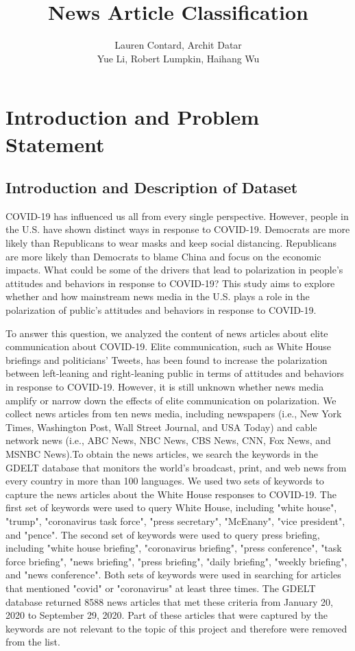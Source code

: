 \documentclass[11pt]{article}
\title{\Huge News Article Classification}
\author{Lauren Contard, Archit Datar \\ 
Yue Li, Robert Lumpkin, Haihang Wu}
\date{}
\begin{document}
\begin{singlespace}
    \maketitle
\end{singlespace}


\section{Introduction and Problem Statement}
\subsection{Introduction and Description of Dataset}

COVID-19 has influenced us all from every single perspective. However, people in the U.S. have shown distinct ways in response to COVID-19. Democrats are more likely than Republicans to wear masks and keep social distancing. Republicans are more likely than Democrats to blame China and focus on the economic impacts. What could be some of the drivers that lead to polarization in people's attitudes and behaviors in response to COVID-19? This study aims to explore whether and how mainstream news media in the U.S. plays a role in the polarization of public's attitudes and behaviors in response to COVID-19. 

To answer this question, we analyzed the content of news articles about elite communication about COVID-19. Elite communication, such as White House briefings and politicians' Tweets, has been found to increase the polarization between left-leaning and right-leaning public in terms of attitudes and behaviors in response to COVID-19. However, it is still unknown whether news media amplify or narrow down the effects of elite communication on polarization. We collect news articles from ten news media, including newspapers (i.e., New York Times, Washington Post, Wall Street Journal, and USA Today) and cable network news (i.e., ABC News, NBC News, CBS News, CNN, Fox News, and MSNBC News).To obtain the news articles, we search the keywords in the GDELT database that monitors the world's broadcast, print, and web news from every country in more than 100 languages. We used two sets of keywords to capture the news articles about the White House responses to COVID-19. The first set of keywords were used to query White House, including "white house", "trump", "coronavirus task force", "press secretary", "McEnany", "vice president", and "pence". The second set of keywords were used to query press briefing, including "white house briefing", "coronavirus briefing", "press conference", "task force briefing", "news briefing", "press briefing", "daily briefing", "weekly briefing", and "news conference". Both sets of keywords were used in searching for articles that mentioned "covid" or "coronavirus" at least three times. The GDELT database returned 8588 news articles that met these criteria from January 20, 2020 to September 29, 2020. Part of these articles that were captured by the keywords are not relevant to the topic of this project and therefore were removed from the list.
\end{document}
